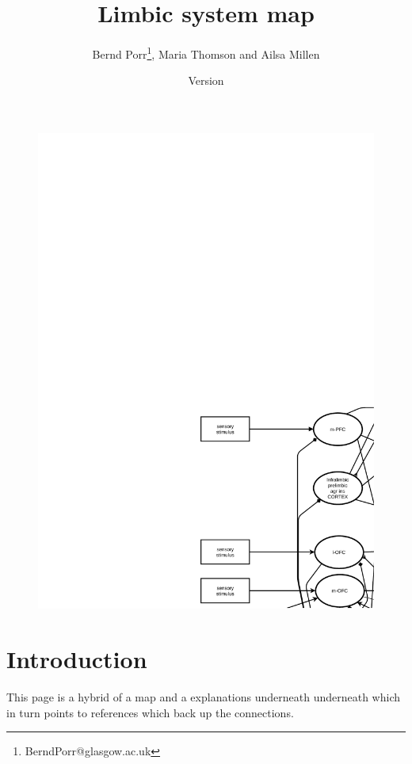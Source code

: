 \documentclass[12pt,a4paper]{article}
\title{Limbic system map}
\author{Bernd Porr\footnote{BerndPorr@glasgow.ac.uk}, Maria Thomson and Ailsa Millen}
\date{Version }
\begin{document}
\maketitle

\begin{latexonly}
\begin{figure}[!htb]
    \begin{center}
    \includegraphics[width=\textwidth]{limbic-map}
    \end{center}
\end{figure}
\end{latexonly}



\tableofcontents

\section{Introduction}
This page is a hybrid of a map and a explanations underneath underneath which in turn points to references which back up the connections.
\end{document}
